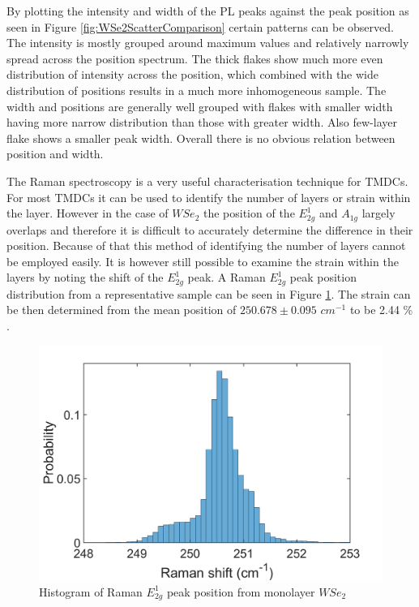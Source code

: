 By plotting the intensity and width of the PL peaks against the peak position as seen in Figure \ref{fig:WSe2ScatterComparison} certain patterns can be observed. The intensity is mostly grouped around maximum values and relatively narrowly spread across the position spectrum. The thick flakes show much more even distribution of intensity across the position, which combined with the wide distribution of positions results in a much more inhomogeneous sample. The width and positions are generally well grouped with flakes with smaller width having more narrow distribution than those with greater width. Also few-layer flake shows a smaller peak width. Overall there is no obvious relation between position and width. 


The Raman spectroscopy is a very useful characterisation technique for TMDCs. For most TMDCs it can be used to identify the number of layers or strain within the layer. However in the case of $WSe_2$ the position of the $E^1_{2g}$ and $A_{1g}$ largely overlaps and therefore it is difficult to accurately determine the difference in their position. Because of that this method of identifying the number of layers cannot be employed easily. It is however still possible to examine the strain within the layers by noting the shift of the $E^1_{2g}$ peak. A Raman $E^1_{2g}$ peak position distribution from a representative sample can be seen in Figure \ref{fig:WSe2RamanPositionHistogram1}. The strain can be then determined from the mean position of $250.678 \pm 0.095$ $cm^{-1}$ to be 2.44 {\%} \cite{Dadgar2018}.

\begin{figure}[!h]
	\begin{center}
		\includegraphics[scale=0.3]{WSe2/WSe2RamanPositionHistogram1.png}
		\caption{Histogram of Raman $E^1_{2g}$ peak position from monolayer $WSe_2$}
		\label{fig:WSe2RamanPositionHistogram1}
	\end{center}
\end{figure}

